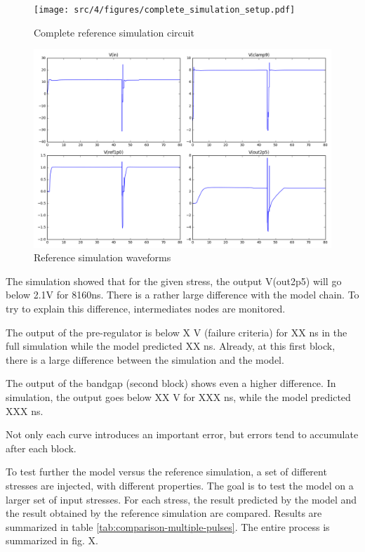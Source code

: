 \begin{figure}[!htbp]
  \centering
  \texttt{[image: src/4/figures/complete\_simulation\_setup.pdf]}
  \caption{Complete reference simulation circuit}
  \label{fig:reference_simu_circuit}
\end{figure}

\begin{figure}[!htbp]
  \centering
  \includegraphics[width=\textwidth]{src/4/figures/total_simulation.png}
  \caption{Reference simulation waveforms}
  \label{fig:reference_simu}
\end{figure}

The simulation showed that for the given stress, the output V(out2p5) will go below 2.1V for 8160ns.
There is a rather large difference with the model chain.
To try to explain this difference, intermediates nodes are monitored.

The output of the pre-regulator is below X V (failure criteria) for XX ns in the full simulation while the model predicted XX ns.
Already, at this first block, there is a large difference between the simulation and the model.

The output of the bandgap (second block) shows even a higher difference.
In simulation, the output goes below XX V for XXX ns, while the model predicted XXX ns.

Not only each curve introduces an important error, but errors tend to accumulate after each block.

To test further the model versus the reference simulation, a set of different stresses are injected, with different properties.
The goal is to test the model on a larger set of input stresses.
For each stress, the result predicted by the model and the result obtained by the reference simulation are compared.
Results are summarized in table \ref{tab:comparison-multiple-pulses}.
The entire process is summarized in fig. X.

